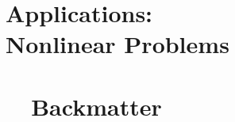 \documentclass[10pt]{newsiambook}
\begin{document}
\part{Applications:\\Nonlinear Problems}




%
%
%
%

\part{\ \ Backmatter}
\backmatter
%
%
%
%



\printindex
\end{document}
